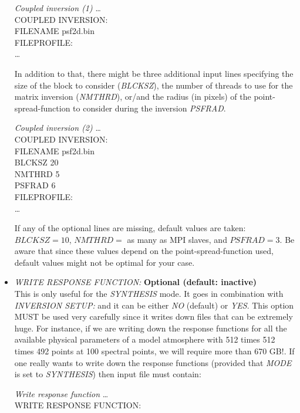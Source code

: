\begin{itemize}
\begin{ifbox}[label={tb:coupled_inversion1}]{{\it Coupled inversion (1)}}
  \scriptsize
  \ldots\\
  COUPLED INVERSION:\\
  FILENAME  psf2d.bin\\
  FILEPROFILE:\\
  \ldots
  \normalsize
\end{ifbox}
  In addition to that, there might be three additional input lines specifying the size of the block to consider ({\it BLCKSZ}), the number of threads to use for the matrix inversion ({\it NMTHRD}), or/and the radius (in pixels) of the point-spread-function to consider during the inversion {\it PSFRAD}.\\
\begin{ifbox}[label={tb:coupled_inversion1}]{{\it Coupled inversion (2)}}
  \scriptsize
  \ldots\\
  COUPLED INVERSION:\\
  FILENAME  psf2d.bin\\
  BLCKSZ 20\\
  NMTHRD 5\\
  PSFRAD 6\\
  FILEPROFILE:\\
  \ldots
  \normalsize
\end{ifbox}
  If any of the optional lines are missing, default values are taken: $BLCKSZ=10$, $NMTHRD=$ as many as MPI slaves, and $PSFRAD=3$. Be aware that since these values depend on the point-spread-function used, default values might not be optimal for your case.
  \item {\it WRITE RESPONSE FUNCTION:} {\bf Optional (default: inactive)}\\
  This is only useful for the {\it SYNTHESIS} mode. It goes in combination with {\it INVERSION SETUP:} and it can be either {\it NO} (default) or {\it YES}. This option MUST be used very carefully since it writes down files that can be extremely huge. For instance, if we are writing down the response functions for all the available physical parameters of a model atmosphere with 512 times 512 times 492 points at 100 spectral points, we will require more than 670 GB!. If one really wants to write down the response functions (provided that {\it MODE} is set to {\it SYNTHESIS}) then input file must contain:
\begin{ifbox}[label={tb:write_response_function}]{{\it Write response function}}
  \scriptsize
  \ldots\\
  WRITE RESPONSE FUNCTION:\\

\end{ifbox}
\end{itemize}
